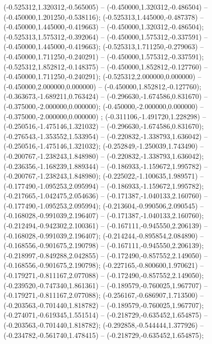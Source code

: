  (-0.525312,1.320312,-0.565005) -- (-0.450000,1.320312,-0.486504) -- (-0.450000,1.201250,-0.538116);
 (-0.525313,1.445000,-0.487378) -- (-0.450000,1.445000,-0.419663) -- (-0.450000,1.320312,-0.486504);
 (-0.525313,1.575312,-0.392064) -- (-0.450000,1.575312,-0.337591) -- (-0.450000,1.445000,-0.419663);
 (-0.525313,1.711250,-0.279063) -- (-0.450000,1.711250,-0.240291) -- (-0.450000,1.575312,-0.337591);
 (-0.525312,1.852812,-0.148375) -- (-0.450000,1.852812,-0.127760) -- (-0.450000,1.711250,-0.240291);
 (-0.525312,2.000000,0.000000) -- (-0.450000,2.000000,0.000000) -- (-0.450000,1.852812,-0.127760);
 (-0.363673,-1.689211,0.763424) -- (-0.296630,-1.674586,0.831670) -- (-0.375000,-2.000000,0.000000);
 (-0.450000,-2.000000,0.000000) -- (-0.375000,-2.000000,0.000000) ;
 (-0.311106,-1.491720,1.228298) -- (-0.250516,-1.475146,1.321032) -- (-0.296630,-1.674586,0.831670);
 (-0.276543,-1.353552,1.533954) -- (-0.220832,-1.338793,1.636042) -- (-0.250516,-1.475146,1.321032);
 (-0.252849,-1.250039,1.743490) -- (-0.200767,-1.238243,1.848980) -- (-0.220832,-1.338793,1.636042);
 (-0.236356,-1.168239,1.889344) -- (-0.186933,-1.159672,1.995782) -- (-0.200767,-1.238243,1.848980);
 (-0.225022,-1.100635,1.989571) -- (-0.177490,-1.095253,2.095994) -- (-0.186933,-1.159672,1.995782);
 (-0.217665,-1.042475,2.054636) -- (-0.171387,-1.040133,2.160760) -- (-0.177490,-1.095253,2.095994);
 (-0.213604,-0.990506,2.090545) -- (-0.168028,-0.991039,2.196407) -- (-0.171387,-1.040133,2.160760);
 (-0.212494,-0.942302,2.100361) -- (-0.167111,-0.945550,2.206139) -- (-0.168028,-0.991039,2.196407);
 (-0.214244,-0.895854,2.084890) -- (-0.168556,-0.901675,2.190798) -- (-0.167111,-0.945550,2.206139);
 (-0.218997,-0.849288,2.042855) -- (-0.172490,-0.857552,2.149050) -- (-0.168556,-0.901675,2.190798);
 (-0.227165,-0.800600,1.970621) -- (-0.179271,-0.811167,2.077088) -- (-0.172490,-0.857552,2.149050);
 (-0.239520,-0.747340,1.861361) -- (-0.189579,-0.760025,1.967707) -- (-0.179271,-0.811167,2.077088);
 (-0.256167,-0.686907,1.713500) -- (-0.203563,-0.701440,1.818782) -- (-0.189579,-0.760025,1.967707);
 (-0.274071,-0.619345,1.551514) -- (-0.218729,-0.635452,1.654875) -- (-0.203563,-0.701440,1.818782);
 (-0.292858,-0.544444,1.377926) -- (-0.234782,-0.561740,1.478415) -- (-0.218729,-0.635452,1.654875);
